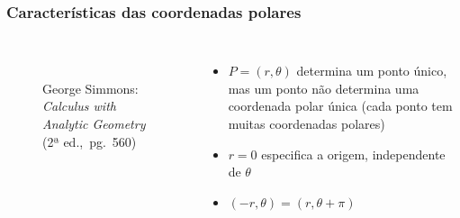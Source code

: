 \documentclass[pdftex, brazil, aspectratio=169]{beamer}
\begin{document}
\begin{frame}[t]
  \frametitle{Características das coordenadas polares}
  \begin{columns}
    \centering
    \begin{figure}[H]
      \begin{center}
        \label{fig:int2-08}
        \\
        \footnotesize{George Simmons: \emph{Calculus with Analytic
            Geometry} (2ª ed.,\ pg.\ 560)}
      \end{center}
    \end{figure}
    \begin{itemize}
      \item $P=(r,\theta)$ determina um ponto único, mas um ponto não
            determina uma coordenada polar única (cada ponto tem
            muitas coordenadas polares)
      \item $r=0$ especifica a origem, independente de $\theta$
      \item $(-r, \theta) = (r, \theta + \pi)$
    \end{itemize}
  \end{columns}
\end{frame}
\end{document}
